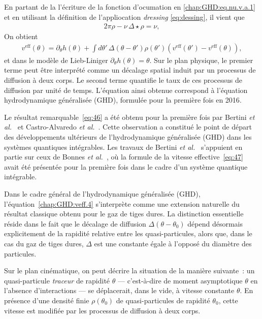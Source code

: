 En partant de la l'écriture de la fonction d'ocumation en \eqref{chap:GHD:eq.nu.v.a.1} et en utilisant la définition de l'appliocation \emph{dressing} \eqref{eq:dessing}, il vient que 
\begin{eqnarray}\label{chap:GHD:veff.3}
	2 \pi \rho - \nu \, 	\Delta \star  \rho = \nu, 
\end{eqnarray}
On obtient 
\begin{eqnarray}\label{chap:GHD:veff.4}
	v^{\mathrm{eff}} ( \theta )      =  \partial_\theta h ( \theta )   +  \int d \theta' \, \Delta(\theta - \theta') \rho ( \theta') ( v^{\mathrm{eff}} ( \theta' ) - v^{\mathrm{eff}} ( \theta )  )   ,
\end{eqnarray}
et dans le modèle de Lieb-Liniger $\partial_\theta h ( \theta )   = \theta$.
Sur le plan physique, le premier terme peut être interprété comme un décalage spatial induit par un processus de diffusion à deux corps. Le second terme quantifie le taux de ces processus de diffusion par unité de temps. L’équation ainsi obtenue correspond à l’équation hydrodynamique généralisée (GHD), formulée pour la première fois en 2016\cite{Bertini2016,CastroAlvaredo2016}.

Le résultat remarquable~\eqref{eq:46} a été obtenu pour la première fois par Bertini \emph{et al.}~\cite{Bertini2016} et Castro-Alvaredo \emph{et al.}~\cite{CastroAlvaredo2016}. Cette observation a constitué le point de départ des développements ultérieurs de l’hydrodynamique généralisée (GHD) dans les systèmes quantiques intégrables. Les travaux de Bertini \emph{et al.}~\cite{Bertini2016} s’appuient en partie sur ceux de Bonnes \emph{et al.}~\cite{Bonnes2014}, où la formule de la vitesse effective~\eqref{eq:47} avait été présentée pour la première fois dans le cadre d’un système quantique intégrable.

Dans le cadre général de l’hydrodynamique généralisée (GHD), l’équation~\eqref{chap:GHD:veff.4} s’interprète comme une extension naturelle du résultat classique obtenu pour le gaz de tiges dures. La distinction essentielle réside dans le fait que le décalage de diffusion \(\Delta(\theta - \theta_0)\) dépend désormais explicitement de la rapidité relative entre les quasi-particules, alors que, dans le cas du gaz de tiges dures, \(\Delta\) est une constante égale à l’opposé du diamètre des particules.

Sur le plan cinématique, on peut décrire la situation de la manière suivante~: un quasi-particule \emph{traceur} de rapidité \(\theta\) --- c’est-à-dire de moment asymptotique \(\theta\) en l’absence d’interactions --- se déplacerait, dans le vide, à vitesse constante \( \theta \). En présence d’une densité finie \(\rho(\theta_0)\) de quasi-particules de rapidité \(\theta_0\), cette vitesse est modifiée par les processus de diffusion à deux corps.


